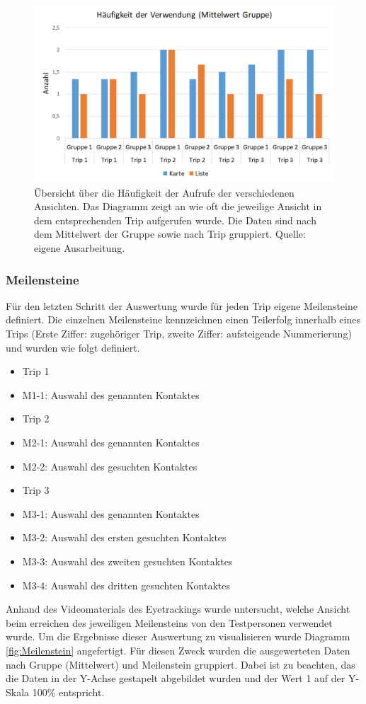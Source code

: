 \documentclass[Bachelorarbeit.tex]{subfiles}
\begin{document}
\begin{figure}[H]
\centering
\includegraphics[width=0.7\linewidth]{img/Evaluation/Darstellungsformen/Haufigkeit}
\caption[Häufigkeit der der verwendeten Ansichten]{Übersicht über die Häufigkeit der Aufrufe der verschiedenen Ansichten. Das Diagramm zeigt an wie oft die jeweilige Ansicht in dem entsprechenden Trip aufgerufen wurde. Die Daten sind nach dem Mittelwert der Gruppe sowie nach Trip gruppiert. Quelle: eigene Ausarbeitung.}
\label{fig:Haufigkeit}
\end{figure}

\subsubsection{Meilensteine}
\label{Meilensteine} 
Für den letzten Schritt der Auswertung wurde für jeden Trip eigene Meilensteine definiert. 
Die einzelnen Meilensteine kennzeichnen einen Teilerfolg innerhalb eines Trips (Erste Ziffer: zugehöriger Trip, zweite Ziffer: aufsteigende Nummerierung) und wurden wie folgt definiert. 
\begin{itemize}
	\item Trip 1
	\item[] M1-1: Auswahl des genannten Kontaktes 
	\item Trip 2
	\item[] M2-1: Auswahl des genannten Kontaktes
	\item[] M2-2: Auswahl des gesuchten Kontaktes
	\item Trip 3
	\item[] M3-1: Auswahl des genannten Kontaktes
	\item[] M3-2: Auswahl des ersten gesuchten Kontaktes
	\item[] M3-3: Auswahl des zweiten gesuchten Kontaktes
	\item[] M3-4: Auswahl des dritten gesuchten Kontaktes
\end{itemize}
Anhand des Videomaterials des Eyetrackings wurde untersucht, welche Ansicht beim erreichen des jeweiligen Meilensteins von den Testpersonen verwendet wurde. 
Um die Ergebnisse dieser Auswertung zu visualisieren wurde Diagramm \ref{fig:Meilenstein} angefertigt. 
Für diesen Zweck wurden die ausgewerteten Daten nach Gruppe (Mittelwert) und Meilenstein gruppiert.
Dabei ist zu beachten, das die Daten in der Y-Achse gestapelt abgebildet wurden und der Wert 1 auf der Y-Skala 100\% entspricht. 
\end{document}
